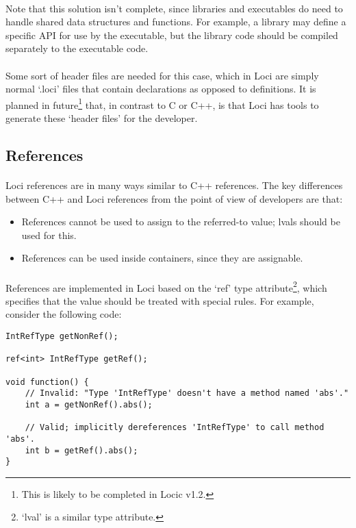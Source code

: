 \documentclass[12pt,twoside,notitlepage]{report}
\begin{document}
\paragraph{}
Note that this solution isn't complete, since libraries and executables do need to handle shared data structures and functions. For example, a library may define a specific API for use by the executable, but the library code should be compiled separately to the executable code.

\paragraph{}
Some sort of header files are needed for this case, which in Loci are simply normal `.loci' files that contain declarations as opposed to definitions. It is planned in future\footnote{This is likely to be completed in Locic v1.2.} that, in contrast to C or C++, is that Loci has tools to generate these `header files' for the developer.

\clearpage

\subsection{References}

\paragraph{}
Loci references are in many ways similar to C++ references. The key differences between C++ and Loci references from the point of view of developers are that:

\begin{itemize}
\item References cannot be used to assign to the referred-to value; lvals should be used for this.
\item References can be used inside containers, since they are assignable.
\end{itemize}

\paragraph{}
References are implemented in Loci based on the `ref' type attribute\footnote{`lval' is a similar type attribute.}, which specifies that the value should be treated with special rules. For example, consider the following code:

\begin{lstlisting}
IntRefType getNonRef();

ref<int> IntRefType getRef();

void function() {
	// Invalid: "Type 'IntRefType' doesn't have a method named 'abs'."
	int a = getNonRef().abs();
	
	// Valid; implicitly dereferences 'IntRefType' to call method 'abs'.
	int b = getRef().abs();
}
\end{lstlisting}
\end{document}
